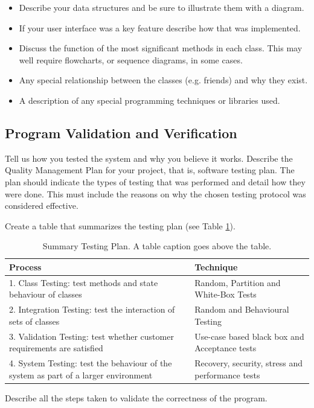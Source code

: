 \documentclass[11pt,a4paper]{article}
\begin{document}
\begin{itemize}
\item Describe your data structures and be sure to illustrate them
  with a diagram.

\item If your user interface was a key feature describe how that was
  implemented.

\item Discuss the function of the most significant methods in each
  class. This may well require flowcharts, or sequence diagrams, in
  some cases.

\item Any special relationship between the classes (e.g. friends) and
  why they exist.

\item A description of any special programming techniques or libraries
  used.
\end{itemize}

\subsection{Program Validation and Verification}
\label{ss:progr-valid-verif}

Tell us how you tested the system and why you believe it works.
Describe the Quality Management Plan for your project, that is,
software testing plan. The plan should indicate the types of testing
that was performed and detail how they were done. This must include
the reasons on why the chosen testing protocol was considered
effective.

Create a table that summarizes the testing plan (see Table
\ref{tab:test-plan}).

\begin{table}[h!]
  \centering
\caption{Summary Testing Plan. A table caption goes above the table.}

\begin{tabular}[t]{|p{8cm}|p{7cm}|} \hline

  \textbf{Process} & \textbf{Technique} \\ \hline 1. Class
    Testing: test methods and state behaviour of classes & Random,
    Partition and White-Box Tests \\ \hline 2. Integration Testing:
    test the
    interaction of sets of classes & Random and Behavioural Testing \\
    \hline 3. Validation Testing: test whether customer requirements
    are satisfied & Use-case based black box and Acceptance tests \\
    \hline 4. System Testing: test the behaviour of the system as part
    of a larger environment & Recovery, security, stress and
    performance tests \\ \hline

\end{tabular}

\label{tab:test-plan}
\end{table}
Describe all the steps taken to validate the correctness of the
program.
\end{document}
